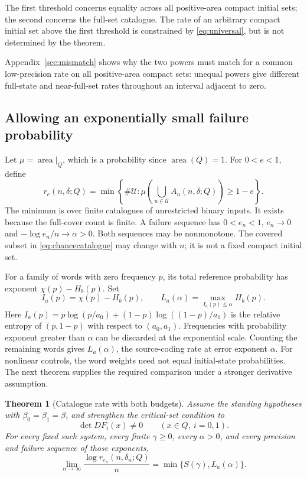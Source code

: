 \documentclass[11pt]{amsart}
\newtheorem{theorem}{Theorem}[section]
\theoremstyle{definition}
\theoremstyle{remark}
\newcommand{\area}{\operatorname{area}}
\numberwithin{equation}{section}
\begin{document}
The first threshold concerns equality across all positive-area
compact initial sets; the second concerns the full-set catalogue.
The rate of an arbitrary compact initial set above the first
threshold is constrained by \eqref{eq:universal}, but is not
determined by the theorem.

Appendix~\ref{sec:mismatch} shows why the two powers must match
for a common low-precision rate on all positive-area compact sets:
unequal powers give different full-state and near-full-set rates
throughout an interval adjacent to zero.

\subsection{Allowing an exponentially small failure probability}
Let $\mu=\area|_Q$, which is a probability since $\area(Q)=1$.
For $0<e<1$, define
\begin{equation}\label{eq:chancecatalogue}
r_e(n,\delta;Q)=\min\left\{\#\mathcal U:
\mu\left(\bigcup_{u\in\mathcal U}A_u(n,\delta;Q)\right)\ge1-e\right\}.
\end{equation}
The minimum is over finite catalogues of unrestricted binary inputs.
It exists because the full-cover count is finite.
A failure sequence has $0<e_n<1$, $e_n\to0$ and
$-\log e_n/n\to\alpha>0$. Both sequences may be nonmonotone.
The covered subset in \eqref{eq:chancecatalogue} may
change with $n$; it is not a fixed compact initial set.


For a family of words with zero frequency $p$, its total reference
probability has exponent $\chi(p)-H_b(p)$. Set
\begin{equation}\label{eq:reliabilityfunction}
I_a(p)=\chi(p)-H_b(p),\qquad
L_a(\alpha)=\max_{I_a(p)\le\alpha}H_b(p).
\end{equation}
Here $I_a(p)=p\log(p/a_0)+(1-p)\log((1-p)/a_1)$ is the
relative entropy of $(p,1-p)$ with respect to $(a_0,a_1)$.
Frequencies with probability exponent greater than $\alpha$ can
be discarded at the exponential scale. Counting the remaining
words gives $L_a(\alpha)$, the source-coding rate at error exponent
$\alpha$. For nonlinear controls, the word weights need not equal
initial-state probabilities. The next theorem supplies the required
comparison under a stronger derivative assumption.

\begin{theorem}[Catalogue rate with both budgets]\label{thm:reliability}
Assume the standing hypotheses with $\beta_0=\beta_1=\beta$,
and strengthen the critical-set condition to
\begin{equation}\label{eq:noncritical}
\det DF_i(x)\ne0\qquad(x\in Q,\ i=0,1).
\end{equation}
For every fixed such system, every finite $\gamma\ge0$, every
$\alpha>0$, and every precision and failure sequence of those
exponents,
\begin{equation}\label{eq:jointcost}
\lim_{n\to\infty}\frac{\log r_{e_n}(n,\delta_n;Q)}{n}
                   =\min\{S(\gamma),L_a(\alpha)\}.
\end{equation}
\end{theorem}
\end{document}

